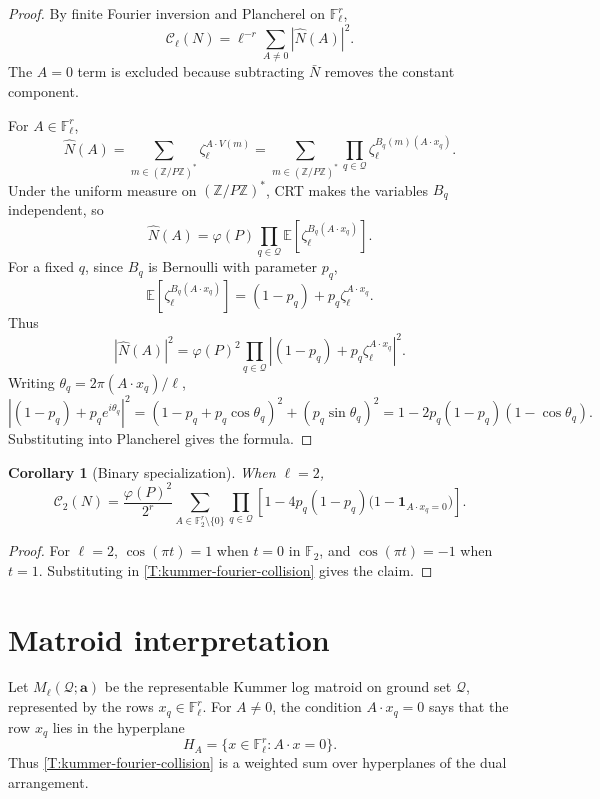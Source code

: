 \documentclass[11pt]{article}
\newtheorem{corollary}{Corollary}
\newcommand{\Z}{\mathbb Z}
\newcommand{\F}{\mathbb F}
\newcommand{\E}{\mathbb E}
\newcommand{\one}{\mathbf 1}
\begin{document}
\begin{proof}
By finite Fourier inversion and Plancherel on \(\F_\ell^r\),
\[
\mathcal C_\ell(N)=
\ell^{-r}\sum_{A\ne0}|\widehat N(A)|^2.
\]
The \(A=0\) term is excluded because subtracting \(\bar N\) removes the constant component.

For \(A\in\F_\ell^r\),
\[
\widehat N(A)
=
\sum_{m\in(\Z/P\Z)^*}\zeta_\ell^{A\cdot V(m)}
=
\sum_{m\in(\Z/P\Z)^*}
\prod_{q\in\mathcal Q}\zeta_\ell^{B_q(m)(A\cdot x_q)}.
\]
Under the uniform measure on \((\Z/P\Z)^*\), CRT makes the variables \(B_q\) independent, so
\[
\widehat N(A)
=
\varphi(P)
\prod_{q\in\mathcal Q}
\E\left[\zeta_\ell^{B_q(A\cdot x_q)}\right].
\]
For a fixed \(q\), since \(B_q\) is Bernoulli with parameter \(p_q\),
\[
\E\left[\zeta_\ell^{B_q(A\cdot x_q)}\right]
=
(1-p_q)+p_q\zeta_\ell^{A\cdot x_q}.
\]
Thus
\[
|\widehat N(A)|^2
=
\varphi(P)^2
\prod_{q\in\mathcal Q}
\left|(1-p_q)+p_q\zeta_\ell^{A\cdot x_q}\right|^2.
\]
Writing \(\theta_q=2\pi(A\cdot x_q)/\ell\),
\[
\left|(1-p_q)+p_q e^{i\theta_q}\right|^2
=
(1-p_q+p_q\cos\theta_q)^2+(p_q\sin\theta_q)^2
=
1-2p_q(1-p_q)(1-\cos\theta_q).
\]
Substituting into Plancherel gives the formula.
\end{proof}

\begin{corollary}[Binary specialization]\label{C:binary-specialization}
When \(\ell=2\),
\[
\mathcal{C}_2(N)=
\frac{\varphi(P)^2}{2^r}
\sum_{A\in\F_2^r\setminus\{0\}}
\prod_{q\in\mathcal Q}
\left[
1-4p_q(1-p_q)\bigl(1-\one_{A\cdot x_q=0}\bigr)
\right].
\]
\end{corollary}

\begin{proof}
For \(\ell=2\), \(\cos(\pi t)=1\) when \(t=0\) in \(\F_2\), and \(\cos(\pi t)=-1\) when \(t=1\).  Substituting in \cref{T:kummer-fourier-collision} gives the claim.
\end{proof}

\section{Matroid interpretation}

Let \(M_\ell(\mathcal Q;\mathbf a)\) be the representable Kummer log matroid on ground set \(\mathcal Q\), represented by the rows \(x_q\in\F_\ell^r\).  For \(A\ne0\), the condition \(A\cdot x_q=0\) says that the row \(x_q\) lies in the hyperplane
\[
H_A=\{x\in\F_\ell^r:A\cdot x=0\}.
\]
Thus \cref{T:kummer-fourier-collision} is a weighted sum over hyperplanes of the dual arrangement.
\end{document}
